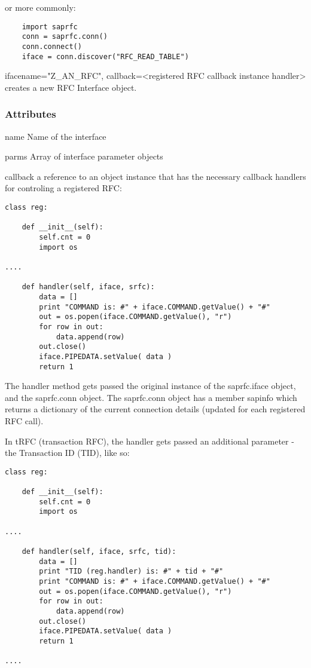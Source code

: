 \documentclass{howto}
\begin{document}
or more commonly:

\begin{verbatim}
	import saprfc
	conn = saprfc.conn()
	conn.connect()
	iface = conn.discover("RFC_READ_TABLE")
\end{verbatim}

\begin{funcdesc}{iface}{name="Z_AN_RFC", callback=<registered RFC callback instance handler> }
creates a new RFC Interface object.
\end{funcdesc}


\subsubsection{Attributes \label{ifaceattrs}}

\begin{memberdesc}[iface]{name}
    Name of the interface
\end{memberdesc}

\begin{memberdesc}[iface]{parms}
    Array of interface parameter objects
\end{memberdesc}

\begin{memberdesc}[iface]{callback}
    a reference to an object instance that has the necessary callback handlers for controling a registered RFC:

\begin{verbatim}
class reg:

	def __init__(self):
		self.cnt = 0
		import os

....

	def handler(self, iface, srfc):
		data = []
		print "COMMAND is: #" + iface.COMMAND.getValue() + "#"
		out = os.popen(iface.COMMAND.getValue(), "r")
		for row in out:
			data.append(row)
		out.close()
		iface.PIPEDATA.setValue( data )
		return 1

\end{verbatim}
   The handler method gets passed the original instance of the saprfc.iface object, and the saprfc.conn object.
   The saprfc.conn object has a member sapinfo which returns a dictionary of the current connection details (updated for each registered RFC call).

   In tRFC (transaction RFC), the handler gets passed an additional parameter - the Transaction ID (TID), like so:

\begin{verbatim}
class reg:

	def __init__(self):
		self.cnt = 0
		import os

....

	def handler(self, iface, srfc, tid):
		data = []
		print "TID (reg.handler) is: #" + tid + "#"
		print "COMMAND is: #" + iface.COMMAND.getValue() + "#"
		out = os.popen(iface.COMMAND.getValue(), "r")
		for row in out:
			data.append(row)
		out.close()
		iface.PIPEDATA.setValue( data )
		return 1

....

\end{verbatim}


\end{memberdesc}
\end{document}
